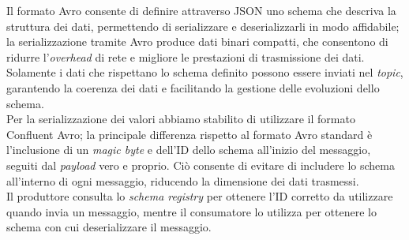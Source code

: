 Il formato Avro consente di definire attraverso JSON uno schema che descriva la struttura dei dati, permettendo di serializzare e deserializzarli in modo affidabile; la serializzazione tramite
Avro produce dati binari compatti, che consentono di ridurre l'\textit{overhead} di rete e migliore le prestazioni di trasmissione dei dati.
Solamente i dati che rispettano lo schema definito possono essere inviati nel \textit{topic}, garantendo la coerenza dei dati e facilitando la gestione delle evoluzioni dello schema.\\
Per la serializzazione dei valori abbiamo stabilito di utilizzare il formato Confluent Avro; la principale differenza rispetto al formato Avro standard è l'inclusione di un \textit{magic byte}
e dell'ID dello schema all'inizio del messaggio, seguiti dal \textit{payload} vero e proprio. Ciò consente di evitare di includere lo schema all'interno di ogni messaggio, riducendo la dimensione dei dati trasmessi.\\
Il produttore consulta lo \textit{schema registry} per ottenere l'ID corretto da utilizzare quando invia un messaggio, mentre il consumatore lo utilizza per ottenere lo schema con
cui deserializzare il messaggio.

